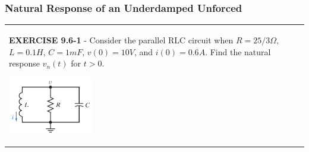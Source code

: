 \documentclass[aspectratio=169]{beamer}
\begin{document}
\begin{frame}[fragile]
	\frametitle{Natural Response of an Underdamped Unforced}
\begin{tabular}{ll}
	\begin{columns}
		\begin{column}{1\textwidth}  %
		\textbf{EXERCISE 9.6-1} - Consider the parallel RLC circuit when $R=25/3 \Omega$, $L = 0.1 H$, $C = 1 mF$, $v(0) = 10 V$, and $i(0) = 0.6 A$. Find the
natural response $v_n (t)$ for $t > 0$.
		
		
		\begin{center}
    			\includegraphics[height=2.5cm]{figure9.png}	
		\end{center}	
		\scalebox{0.8}{Answer: $v_n(t)=10e^{-60t} \cos{(80 t)} \ V$ }
		\end{column}
	\end{columns}
\end{tabular}
\end{frame}




\end{document}
